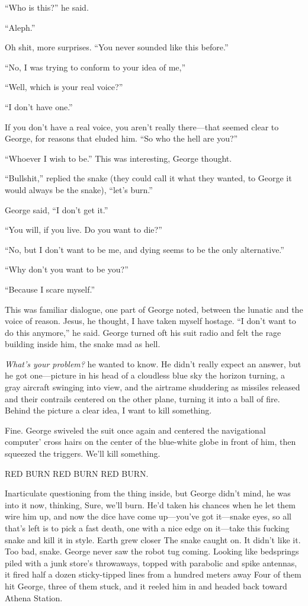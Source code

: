 ``Who is this?'' he said.

``Aleph.''

Oh shit, more surprises. ``You never sounded like this before.''

``No, I was trying to conform to your idea of me,''

``Well, which is your real voice?''

``I don't have one.''

If you don't have a real voice, you aren't really there—that seemed clear to George, for reasons that eluded him. ``So who the hell are you?''

``Whoever I wish to be.'' This was interesting, George thought.

``Bullshit,'' replied the snake (they could call it what they wanted, to George it would always be the snake), ``let's burn.''

George said, ``I don't get it.''

``You will, if you live. Do you want to die?''

``No, but I don't want to be me, and dying seems to be the only alternative.''

``Why don't you want to be you?''

``Because I scare myself.''

This was familiar dialogue, one part of George noted, between the lunatic and the voice of reason. Jesus, he thought, I have taken myself hostage. ``I don't want to do this anymore,'' he said. George turned oft his suit radio and felt the rage building inside him, the snake mad as hell.

\textit{What's your problem?} he wanted to know. He didn't really expect an answer, but he got one—picture in his head of a cloudless blue sky the horizon turning, a gray aircraft swinging into view, and the airtrame shuddering as missiles released and their contrails centered on the other plane, turning it into a ball of fire. Behind the picture a clear idea, I want to kill something.

Fine. George swiveled the suit once again and centered the navigational computer' cross hairs on the center of the blue-white globe in front of him, then squeezed the triggers. We'll kill something.

RED BURN RED BURN RED BURN.

Inarticulate questioning from the thing inside, but George didn't mind, he was into it now, thinking, Sure, we'll burn. He'd taken his chances when he let them wire him up, and now the dice have come up—you've got it—snake eyes, so all that's left is to pick a fast death, one with a nice edge on it—take this fucking snake and kill it in style. Earth grew closer The snake caught on. It didn't like it. Too bad, snake. George never saw the robot tug coming. Looking like bedsprings piled with a junk store's throwaways, topped with parabolic and spike antennas, it fired half a dozen sticky-tipped lines from a hundred meters away Four of them hit George, three of them stuck, and it reeled him in and headed back toward Athena Station.

